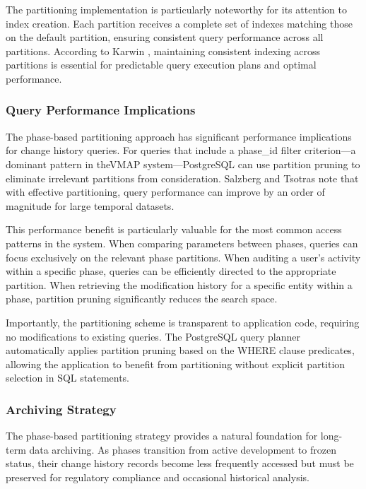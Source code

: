 The partitioning implementation is particularly noteworthy for its attention to index creation. Each partition receives a complete set of indexes matching those on the default partition, ensuring consistent query performance across all partitions. According to Karwin \cite{karwin2010sql}, maintaining consistent indexing across partitions is essential for predictable query execution plans and optimal performance.

\subsubsection{Query Performance Implications}
\label{subsubsec:query-performance-implications}

The phase-based partitioning approach has significant performance implications for change history queries. For queries that include a phase\_id filter criterion—a dominant pattern in the\ac{VMAP} system—PostgreSQL can use partition pruning to eliminate irrelevant partitions from consideration. Salzberg and Tsotras \cite{salzberg1999comparison} note that with effective partitioning, query performance can improve by an order of magnitude for large temporal datasets.

This performance benefit is particularly valuable for the most common access patterns in the system. When comparing parameters between phases, queries can focus exclusively on the relevant phase partitions. When auditing a user's activity within a specific phase, queries can be efficiently directed to the appropriate partition. When retrieving the modification history for a specific entity within a phase, partition pruning significantly reduces the search space.

Importantly, the partitioning scheme is transparent to application code, requiring no modifications to existing queries. The PostgreSQL query planner automatically applies partition pruning based on the WHERE clause predicates, allowing the application to benefit from partitioning without explicit partition selection in SQL statements.

\subsubsection{Archiving Strategy}
\label{subsubsec:archiving-strategy}

The phase-based partitioning strategy provides a natural foundation for long-term data archiving. As phases transition from active development to frozen status, their change history records become less frequently accessed but must be preserved for regulatory compliance and occasional historical analysis.

